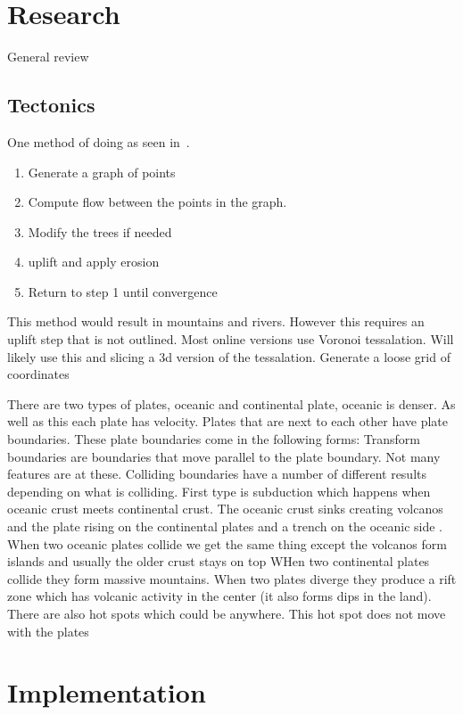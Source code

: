 \documentclass[11pt]{article}
\begin{document}
    \section{Research}
    General review~\cite{galin2019review}

    \subsection{Tectonics}
    One method of doing as seen in~\cite{cordonnier2016large}.
    \begin{enumerate}
        \item Generate a graph of points
        \item Compute flow between the points in the graph.
        \item Modify the trees if needed
        \item uplift and apply erosion
        \item Return to step 1 until convergence
    \end{enumerate}
    This method would result in mountains and rivers.
    However this requires an uplift step that is not outlined.
    Most online versions use Voronoi tessalation.
    Will likely use this and slicing a 3d version of the tessalation.
    Generate a loose grid of coordinates

    There are two types of plates, oceanic and continental plate, oceanic is denser.
    As well as this each plate has velocity.
    Plates that are next to each other have plate boundaries.
    These plate boundaries come in the following forms:
    Transform boundaries are boundaries that move parallel to the plate boundary.
    Not many features are at these.
    Colliding boundaries have a number of different results depending on what is colliding.
    First type is subduction which happens when oceanic crust meets continental crust.
    The oceanic crust sinks creating volcanos and the plate rising on the continental plates and a trench on the oceanic side .
    When two oceanic plates collide we get the same thing except the volcanos form islands and usually the older crust stays on top
    WHen two continental plates collide they form massive mountains.
    When two plates diverge they produce a rift zone which has volcanic activity in the center (it also forms dips in the land).
    There are also hot spots which could be anywhere.
    This hot spot does not move with the plates


    \section{Implementation}\label{sec:implementation}
\end{document}

